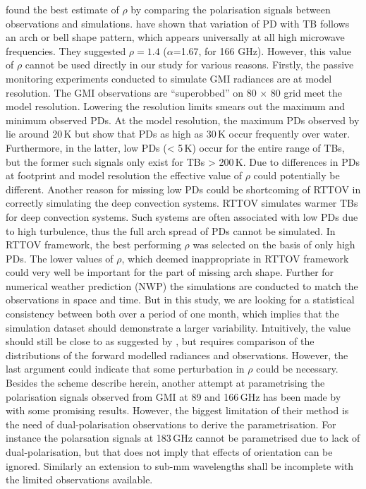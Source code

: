 \documentclass[amt, manuscript]{copernicus}
\begin{document}
\citep{barlakas:intro:21} found the best estimate of $\rho$ by comparing the polarisation signals between observations and simulations. \citet{gong:micro:17} have shown that variation of PD with TB follows an arch or bell shape pattern, which appears universally at all high microwave frequencies.  They suggested $\rho = 1.4$ ($\alpha$=1.67, for 166\,\,GHz). However, this value of $\rho$ cannot be used directly in our study for various reasons. Firstly, the passive monitoring experiments conducted to simulate GMI radiances are at model resolution. The GMI observations are ``superobbed'' on 80 $\times$ 80 grid meet the model resolution. Lowering the resolution limits smears out the maximum and minimum observed PDs. At the model resolution, the maximum PDs observed by \citet{barlakas:intro:21} lie around 20\,K but \citet{gong:micro:17} show that PDs as high as 30\,K occur frequently over water. Furthermore, in the latter, low PDs (< 5\,K) occur for the entire range of TBs, but the former such signals only exist for TBs > 200\,K. Due to differences in PDs at footprint and model resolution the effective value of $\rho$ could potentially be different. Another reason for missing low PDs could be shortcoming of RTTOV in correctly simulating the deep convection systems. RTTOV simulates warmer TBs for deep convection systems. Such systems are often associated with low PDs due to high turbulence, thus the full arch spread of PDs cannot be simulated. In RTTOV framework, the best performing $\rho$ was selected on the basis of only high PDs. The lower values of $\rho$, which deemed inappropriate in RTTOV framework could very well be important for the part of missing arch shape. Further for numerical weather prediction (NWP) the simulations are conducted to match the observations in space and time. But in this study, we are looking for a statistical consistency between both over a period of one month, which implies that the simulation dataset should demonstrate a larger variability.  Intuitively, the value should still be close to as suggested by \citet{barlakas:intro:21}, but requires comparison of the distributions of the forward modelled radiances and observations. However, the last argument could  indicate that some perturbation in $\rho$ could be necessary.
Besides the scheme describe herein, another attempt at parametrising the polarisation signals observed from GMI at 89 and 166\,GHz has been made by \citet{galligani:param:21} with some promising results. However, the biggest limitation of their method is the need of dual-polarisation observations to derive the parametrisation. For instance the polarsation signals at 183\,GHz cannot be parametrised due to lack of dual-polarisation, but that does not imply that effects of orientation can be ignored. Similarly an extension to sub-mm wavelengths shall be incomplete with the limited observations available.  
\end{document}
